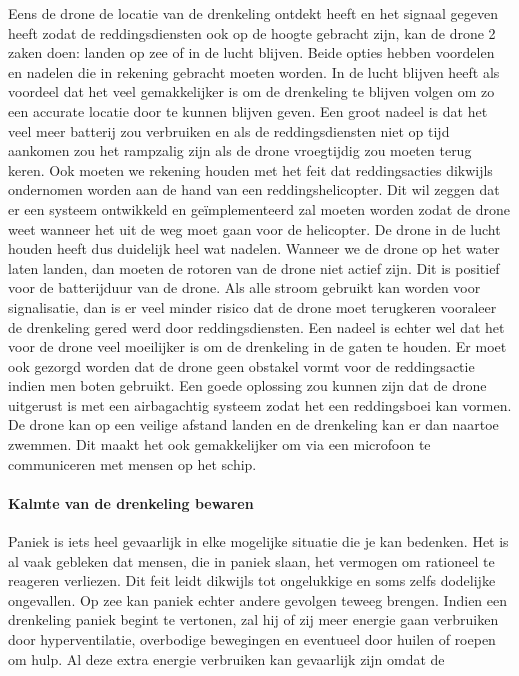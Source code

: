 \subitem
Eens de drone de locatie van de drenkeling ontdekt heeft en het signaal gegeven heeft zodat de reddingsdiensten ook op de hoogte gebracht zijn, kan de drone 2 zaken doen: landen op zee of in de lucht blijven. Beide opties hebben voordelen en nadelen die in rekening gebracht moeten worden. In de lucht blijven heeft als voordeel dat het veel gemakkelijker is om de drenkeling te blijven volgen om zo een accurate locatie door te kunnen blijven geven. Een groot nadeel is dat het veel meer batterij zou verbruiken en als de reddingsdiensten niet op tijd aankomen zou het rampzalig zijn als de drone vroegtijdig zou moeten terug keren. Ook moeten we rekening houden met het feit dat reddingsacties dikwijls ondernomen worden aan de hand van een reddingshelicopter. Dit wil zeggen dat er een systeem ontwikkeld en geïmplementeerd zal moeten worden zodat de drone weet wanneer het uit de weg moet gaan voor de helicopter. De drone in de lucht houden heeft dus duidelijk heel wat nadelen. Wanneer we de drone op het water laten landen, dan moeten de rotoren van de drone niet actief zijn. Dit is positief voor de batterijduur van de drone. Als alle stroom gebruikt kan worden voor signalisatie, dan is er veel minder risico dat de drone moet terugkeren vooraleer de drenkeling gered werd door reddingsdiensten. Een nadeel is echter wel dat het voor de drone veel moeilijker is om de drenkeling in de gaten te houden. Er moet ook gezorgd worden dat de drone geen obstakel vormt voor de reddingsactie indien men boten gebruikt. Een goede oplossing zou kunnen zijn dat de drone uitgerust is met een airbagachtig systeem zodat het een reddingsboei kan vormen. De drone kan op een veilige afstand landen en de drenkeling kan er dan naartoe zwemmen. Dit maakt het ook gemakkelijker om via een microfoon te communiceren met mensen op het schip. 

\paragraph{Kalmte van de drenkeling bewaren}

Paniek is iets heel gevaarlijk in elke mogelijke situatie die je kan bedenken. Het is al vaak gebleken dat mensen, die in paniek slaan, het vermogen om rationeel te reageren verliezen. Dit feit leidt dikwijls tot ongelukkige en soms zelfs dodelijke ongevallen. Op zee kan paniek echter andere gevolgen teweeg brengen. Indien een drenkeling paniek begint te vertonen, zal hij of zij meer energie gaan verbruiken door hyperventilatie, overbodige bewegingen en eventueel door huilen of roepen om hulp. Al deze extra energie verbruiken kan gevaarlijk zijn omdat de 
